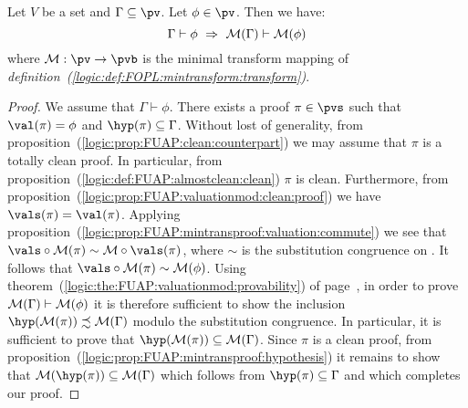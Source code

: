 \begin{prop}\label{logic:prop:FUAP:mintransproof:sequent}
Let $V$ be a set and $\Gamma\subseteq\pv$. Let $\phi\in\pv$. Then we
have:
    \[
    \Gamma\vdash\phi\ \Rightarrow\ {\cal M}(\Gamma)\vdash{\cal
    M}(\phi)
    \]
where ${\cal M}:\pv\to\pvb$ is the minimal transform mapping of {\em
definition~(\ref{logic:def:FOPL:mintransform:transform})}.
\end{prop}
\begin{proof}
We assume that $\Gamma\vdash\phi$. There exists a proof $\pi\in\pvs$
such that $\val(\pi)=\phi$ and $\hyp(\pi)\subseteq\Gamma$. Without
lost of generality, from
proposition~(\ref{logic:prop:FUAP:clean:counterpart}) we may assume
that $\pi$ is a totally clean proof. In particular, from
proposition~(\ref{logic:def:FUAP:almostclean:clean}) $\pi$ is clean.
Furthermore, from
proposition~(\ref{logic:prop:FUAP:valuationmod:clean:proof}) we have
$\vals(\pi)=\val(\pi)$. Applying
proposition~(\ref{logic:prop:FUAP:mintransproof:valuation:commute})
we see that $\vals\circ{\cal M}(\pi)\sim{\cal M}\circ\vals(\pi)$,
where $\sim$ is the substitution congruence on \pvb. It follows that
$\vals\circ{\cal M}(\pi)\sim{\cal M}(\phi)$. Using
theorem~(\ref{logic:the:FUAP:valuationmod:provability}) of
page~\pageref{logic:the:FUAP:valuationmod:provability}, in order to
prove ${\cal M}(\Gamma)\vdash{\cal M}(\phi)$ it is therefore
sufficient to show the inclusion $\hyp({\cal M}(\pi))\precsim{\cal
M}(\Gamma)$ modulo the substitution congruence. In particular, it is
sufficient to prove that $\hyp({\cal M}(\pi))\subseteq{\cal
M}(\Gamma)$. Since $\pi$ is a clean proof, from
proposition~(\ref{logic:prop:FUAP:mintransproof:hypothesis}) it
remains to show that ${\cal M}(\hyp(\pi))\subseteq{\cal M}(\Gamma)$
which follows from $\hyp(\pi)\subseteq\Gamma$ and which completes
our proof.
\end{proof}
